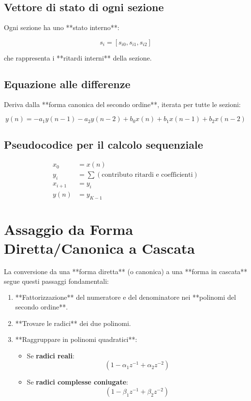 \subsection*{Vettore di stato di ogni sezione}

Ogni sezione ha uno **stato interno**:

\[
s_i = [s_{i0}, s_{i1}, s_{i2}]
\]

che rappresenta i **ritardi interni** della sezione.

\subsection*{Equazione alle differenze}

Deriva dalla **forma canonica del secondo ordine**, iterata per tutte le sezioni:

\[
y(n) = -a_1 y(n-1) - a_2 y(n-2) + b_0 x(n) + b_1 x(n-1) + b_2 x(n-2)
\]

\subsection*{Pseudocodice per il calcolo sequenziale}

\[
\begin{aligned}
    x_0 &= x(n) \\
    y_i &= \sum (\text{contributo ritardi e coefficienti}) \\
    x_{i+1} &= y_i \\
    y(n) &= y_{K-1}
\end{aligned}
\]


\section{Assaggio da Forma Diretta/Canonica a Cascata}

La conversione da una **forma diretta** (o canonica) a una **forma in cascata** segue questi passaggi fondamentali:

\begin{enumerate}
    \item **Fattorizzazione** del numeratore e del denominatore nei **polinomi del secondo ordine**.
    \item **Trovare le radici** dei due polinomi.
    \item **Raggruppare in polinomi quadratici**:
    \begin{itemize}
        \item Se \textbf{radici reali}:
        \[
        (1 - \alpha_1 z^{-1} + \alpha_2 z^{-2})
        \]
        \item Se \textbf{radici complesse coniugate}:
        \[
        (1 - \beta_1 z^{-1} + \beta_2 z^{-2})
        \]
    \end{itemize}
\end{enumerate}

